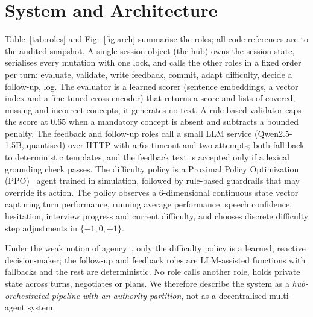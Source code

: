 \documentclass[runningheads]{llncs}
\begin{document}
\section{System and Architecture}\label{sec:arch}
Table~\ref{tab:roles} and Fig.~\ref{fig:arch} summarise the roles; all code references are to the audited snapshot. A single session object (the hub) owns the session state, serialises every mutation with one lock, and calls the other roles in a fixed order per turn: evaluate, validate, write feedback, commit, adapt difficulty, decide a follow-up, log. The evaluator is a learned scorer (sentence embeddings, a vector index and a fine-tuned cross-encoder) that returns a score and lists of covered, missing and incorrect concepts; it generates no text. A rule-based validator caps the score at 0.65 when a mandatory concept is absent and subtracts a bounded penalty. The feedback and follow-up roles call a small LLM service (Qwen2.5-1.5B, quantised) over HTTP with a 6\,s timeout and two attempts; both fall back to deterministic templates, and the feedback text is accepted only if a lexical grounding check passes. The difficulty policy is a Proximal Policy Optimization (PPO)~\cite{ppo,sb3} agent trained in simulation, followed by rule-based guardrails that may override its action. The policy observes a 6-dimensional continuous state vector capturing turn performance, running average performance, speech confidence, hesitation, interview progress and current difficulty, and chooses discrete difficulty step adjustments in $\{-1, 0, +1\}$.

Under the weak notion of agency~\cite{wj95}, only the difficulty policy is a learned, reactive decision-maker; the follow-up and feedback roles are LLM-assisted functions with fallbacks and the rest are deterministic. No role calls another role, holds private state across turns, negotiates or plans. We therefore describe the system as a \emph{hub-orchestrated pipeline with an authority partition}, not as a decentralised multi-agent system.
\end{document}

